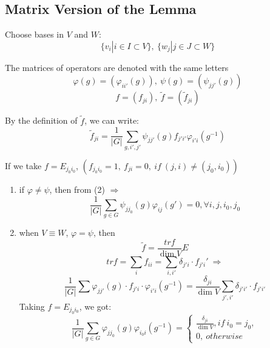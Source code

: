 \documentclass[12pt, a4paper]{article}
\theoremstyle{definition}
\begin{document}
\subsection{Matrix Version of the Lemma}
Choose bases in $V$ and $W$:
\[\{v_i|i\in I\subset V\},\ \{w_j|j\in J \subset W \}\]
\par
The matrices of operators are denoted with the same letters
\[\varphi(g) = (\varphi_{ii'}(g)),\ \psi(g) = (\psi_{jj'}(g))\]
\[f = (f_{ji}),\ \widetilde{f} = (\widetilde{f}_{ji})\]
\par
By the definition of $\widetilde{f}$, we can write:
\begin{equation}
    \widetilde{f}_{ji} = \frac1{|G|} \sum_{g,i',j'}\psi_{jj'}(g)f_{j'i'}\varphi_{i'i}(g^{-1})
\end{equation}
\par
If we take $f = E_{j_0i_0}$, $(f_{j_0i_0} = 1,\ f_{ji} = 0,\ if\ (j,i)\neq (j_0,i_0))$
\begin{enumerate}
    \item if $\varphi \neq \psi$, then from (2) $\Rightarrow$
    \begin{equation}
    \frac1{|G|} \sum_{g\in G} \psi_{jj_0}(g)\varphi_{ij}(g') = 0, \forall i, j, i_0,j_0
    \end{equation}
    \item when $V \equiv W$, $\varphi = \psi$, then 
    \[\widetilde{f} = \frac{tr f}{\dim V}E\]
    \[trf = \sum_{i}f_{ii}=\sum_{i,i'}\delta_{j'i} \cdot f_{j'i}'\ \Rightarrow\]
    \[\frac1{|G|}\sum \varphi_{jj'}(g)\cdot f_{j'i}\cdot \varphi_{i'i}(g^{-1})
    = \frac{\delta_{ji}}{\dim V}\sum_{j',i'}\delta_{j'i'}\cdot f_{j'i'} \]
    Taking $f = E_{j_0i_0}$, we got:
    \[
        \frac1{|G|}\sum_{g\in G}\varphi_{jj_0}(g)\varphi_{i_0i}(g^{-1}) = 
        \begin{cases}
            \frac{\delta_{ji}}{\dim V}, if\ i_0 = j_0, \\
            0,\ otherwise
        \end{cases}
    \]
\end{enumerate}
\end{document}
